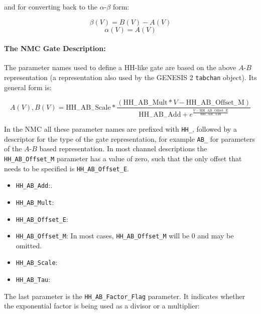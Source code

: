 \documentclass[12pt]{article}
\begin{document}
and for converting back to the $\alpha$-$\beta$ form:

\begin{equation}
  \beta(V) = B(V) - A(V)
\end{equation}
\begin{equation}
  \alpha(V) = A(V)
\end{equation}

\paragraph{The NMC Gate Description:} The parameter names used to define a HH-like gate are based on the
above $A$-$B$ representation (a representation also used by the
GENESIS 2 {\tt tabchan} object).  Its general form is:

\begin{equation}
  \label{eq:hh-general-1}
  A(V), B(V) = \mathrm{HH_{-}AB_{-}Scale} * \frac{ ( \mathrm{HH_{-}AB_{-}Mult} * V - \mathrm{HH_{-}AB_{-}Offset_{-}M} ) }{ \mathrm{HH_{-}AB_{-}Add} + e ^ {\frac{ V - \mathrm{HH_{-}AB_{-}Offset_{-}E} }{ \mathrm{HH_{-}AB_{-}Tau} } } }
\end{equation}

In the NMC all these parameter names are prefixed with {\tt HH\_},
followed by a descriptor for the type of the gate representation, for
example {\tt AB\_} for parameters of the $A$-$B$ based representation.
In most channel descriptions the {\tt HH\_AB\_Offset\_M} parameter has a
value of zero, such that the only offset that needs to be specified is
{\tt HH\_AB\_Offset\_E}.

\begin{itemize}
\item {\tt HH\_AB\_Add}:.
\item {\tt HH\_AB\_Mult}:
\item {\tt HH\_AB\_Offset\_E}:
\item {\tt HH\_AB\_Offset\_M}: In most cases, {\tt HH\_AB\_Offset\_M} will be 0
  and may be omitted.
\item {\tt HH\_AB\_Scale}:
\item {\tt HH\_AB\_Tau}:
\end{itemize}

The last parameter is the {\tt HH\_AB\_Factor\_Flag} parameter.  It
indicates whether the exponential factor is being used as a divisor or
a multiplier:
\end{document}
